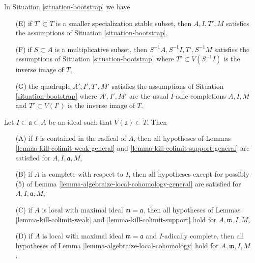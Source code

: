 \begin{lemma}
\label{lemma-bootstrap-inherited}
In Situation \ref{situation-bootstrap} we have
\begin{enumerate}
\item[(E)] if $T' \subset T$ is a smaller specialization stable subset, then
$A, I, T', M$ satisfies the assumptions of Situation \ref{situation-bootstrap},
\item[(F)] if $S \subset A$ is a multiplicative subset, then
$S^{-1}A, S^{-1}I, T', S^{-1}M$
satisfies the assumptions of Situation \ref{situation-bootstrap}
where $T' \subset V(S^{-1}I)$ is the inverse image of $T$,
\item[(G)] the quadruple $A', I', T', M'$
satisfies the assumptions of Situation \ref{situation-bootstrap}
where $A', I', M'$ are the usual $I$-adic completions $A, I, M$
and $T' \subset V(I')$ is the inverse image of $T$.
\end{enumerate}
Let $I \subset \mathfrak a \subset A$ be an ideal such that
$V(\mathfrak a) \subset T$. Then
\begin{enumerate}
\item[(A)] if $I$ is contained in the radical of $A$, then all hypotheses of
Lemmas \ref{lemma-kill-colimit-weak-general} and
\ref{lemma-kill-colimit-support-general} are satisfied
for $A, I, \mathfrak a, M$,
\item[(B)] if $A$ is complete with respect to $I$, then
all hypotheses except for possibly (5) of
Lemma \ref{lemma-algebraize-local-cohomology-general}
are satisfied for $A, I, \mathfrak a, M$,
\item[(C)] if $A$ is local with maximal ideal $\mathfrak m = \mathfrak a$,
then all hypotheses of
Lemmas \ref{lemma-kill-colimit-weak} and \ref{lemma-kill-colimit-support}
hold for $A, \mathfrak m, I, M$,
\item[(D)] if $A$ is local with maximal ideal $\mathfrak m = \mathfrak a$
and $I$-adically complete, then all hypotheses of
Lemma \ref{lemma-algebraize-local-cohomology}
hold for $A, \mathfrak m, I, M$,
\end{enumerate}
\end{lemma}

